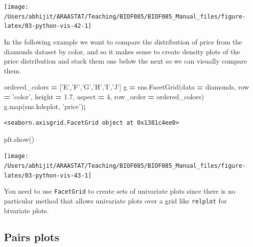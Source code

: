 \documentclass[
  letterpaper,
]{scrbook}
\newenvironment{Shaded}{\begin{snugshade}}{\end{snugshade}}
\newcommand{\BuiltInTok}[1]{#1}
\newcommand{\DecValTok}[1]{\textcolor[rgb]{0.00,0.00,0.81}{#1}}
\newcommand{\FloatTok}[1]{\textcolor[rgb]{0.00,0.00,0.81}{#1}}
\newcommand{\NormalTok}[1]{#1}
\newcommand{\OperatorTok}[1]{\textcolor[rgb]{0.81,0.36,0.00}{\textbf{#1}}}
\newcommand{\StringTok}[1]{\textcolor[rgb]{0.31,0.60,0.02}{#1}}
\begin{document}
\begin{center}\texttt{[image: /Users/abhijit/ARAASTAT/Teaching/BIOF085/BIOF085\_Manual\_files/figure-latex/03-python-vis-42-1]} \end{center}

In the following example we want to compare the distribution of price from the diamonds dataset by color, and so it makes sense to create density plots of the price distribution and stack them one below the next so we can visually compare them.

\begin{Shaded}
\begin{Highlighting}[]
\NormalTok{ordered_colors }\OperatorTok{=}\NormalTok{ [}\StringTok{'E'}\NormalTok{,}\StringTok{'F'}\NormalTok{,}\StringTok{'G'}\NormalTok{,}\StringTok{'H'}\NormalTok{,}\StringTok{'I'}\NormalTok{,}\StringTok{'J'}\NormalTok{]}
\NormalTok{g }\OperatorTok{=}\NormalTok{ sns.FacetGrid(data }\OperatorTok{=}\NormalTok{ diamonds, row }\OperatorTok{=} \StringTok{'color'}\NormalTok{, height }\OperatorTok{=} \FloatTok{1.7}\NormalTok{, }
\NormalTok{                  aspect }\OperatorTok{=} \DecValTok{4}\NormalTok{, row_order }\OperatorTok{=}\NormalTok{ ordered_colors)}
\NormalTok{g.}\BuiltInTok{map}\NormalTok{(sns.kdeplot, }\StringTok{'price'}\NormalTok{)}\OperatorTok{;}
\end{Highlighting}
\end{Shaded}

\begin{verbatim}
<seaborn.axisgrid.FacetGrid object at 0x1381c4ee0>
\end{verbatim}

\begin{Shaded}
\begin{Highlighting}[]
\NormalTok{plt.show()}
\end{Highlighting}
\end{Shaded}

\begin{center}\texttt{[image: /Users/abhijit/ARAASTAT/Teaching/BIOF085/BIOF085\_Manual\_files/figure-latex/03-python-vis-43-1]} \end{center}

You need to use \texttt{FacetGrid} to create sets of univariate plots since there is no particular method that allows univariate plots over a grid like \texttt{relplot} for bivariate plots.

\hypertarget{pairs-plots}{%
\subsection{Pairs plots}\label{pairs-plots}}
\end{document}
